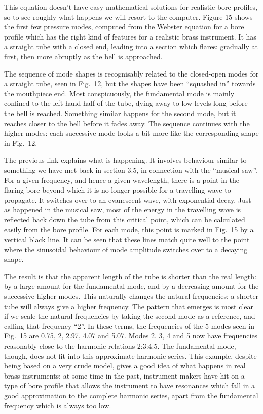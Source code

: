   This equation doesn't have easy mathematical solutions for realistic bore 
  profiles, so to see roughly what happens we will resort to the computer. 
  Figure 15 shows the first few pressure modes, computed from the Webster 
  equation for a bore profile which has the right kind of features for a 
  realistic brass instrument. It has a straight tube with a closed end, leading 
  into a section which flares: gradually at first, then more abruptly as the 
  bell is approached. 

  The sequence of mode shapes is recognisably related to the closed-open modes 
  for a straight tube, seen in Fig.\ 12, but the shapes have been ``squashed 
  in'' towards the mouthpiece end. Most conspicuously, the fundamental mode is 
  mainly confined to the left-hand half of the tube, dying away to low levels 
  long before the bell is reached. Something similar happens for the second 
  mode, but it reaches closer to the bell before it fades away. The sequence 
  continues with the higher modes: each successive mode looks a bit more like 
  the corresponding shape in Fig.\ 12. 

  The previous link explains what is happening. It involves behaviour similar 
  to something we have met back in section 3.5, in connection with the 
  ``musical saw''. For a given frequency, and hence a given wavelength, there 
  is a point in the flaring bore beyond which it is no longer possible for a 
  travelling wave to propagate. It switches over to an evanescent wave, with 
  exponential decay. Just as happened in the musical saw, most of the energy in 
  the travelling wave is reflected back down the tube from this critical point, 
  which can be calculated easily from the bore profile. For each mode, this 
  point is marked in Fig.\ 15 by a vertical black line. It can be seen that 
  these lines match quite well to the point where the sinusoidal behaviour of 
  mode amplitude switches over to a decaying shape. 

  The result is that the apparent length of the tube is shorter than the real 
  length: by a large amount for the fundamental mode, and by a decreasing 
  amount for the successive higher modes. This naturally changes the natural 
  frequencies: a shorter tube will always give a higher frequency. The pattern 
  that emerges is most clear if we scale the natural frequencies by taking the 
  second mode as a reference, and calling that frequency ``2''. In these terms, 
  the frequencies of the 5 modes seen in Fig.\ 15 are 0.75, 2, 2.97, 4.07 and 
  5.07. Modes 2, 3, 4 and 5 now have frequencies reasonably close to the 
  harmonic relations 2:3:4:5. The fundamental mode, though, does not fit into 
  this approximate harmonic series. This example, despite being based on a very 
  crude model, gives a good idea of what happens in real brass instruments: at 
  some time in the past, instrument makers have hit on a type of bore profile 
  that allows the instrument to have resonances which fall in a good 
  approximation to the complete harmonic series, apart from the fundamental 
  frequency which is always too low. 

